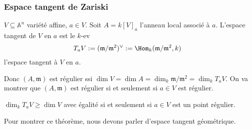             \subsubsection{Espace tangent de Zariski}
                \begin{defi}
                    $V \subseteq \mathbb{A}^n$ variété affine, $a \in V$. Soit $A = k[V]_a$ l'anneau local associé à $a$. L'espace tangent de $V$ en $a$ est le $k$-ev
                    \begin{align*}
                        T_aV := (\mathfrak{m}/ \mathfrak{m}^2)^{\vee} := \Hom_k(\mathfrak{m}/ \mathfrak{m}^2, k)
                    \end{align*}
                    l'espace tangent à $V$ en $a$.
                \end{defi}
                \begin{theo}
                \end{theo}
                Donc $(A, \mathfrak{m})$ est régulier ssi $\dim V =\dim A = \dim_k \mathfrak{m}/ \mathfrak{m}^2 = \dim_k T_aV$. On va montrer que $(A, \mathfrak{m})$ est régulier si et seulement si $a \in V$ est régulier.
                \begin{theo}
                    $\dim_k T_aV \geq \dim V$ avec égalité si et seulement si $a \in V$ est un point régulier.
                \end{theo}
                Pour montrer ce théorème, nous devons parler d'espace tangent géométrique.
            
